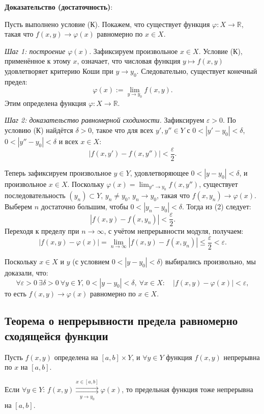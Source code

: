 \documentclass{article}
\begin{document}
\textbf{Доказательство (достаточность)}:

Пусть выполнено условие (К). Покажем, что существует функция $\varphi \colon X \to \mathbb{R}$, такая что $f(x, y) \to \varphi(x)$ равномерно по $x \in X$.

\textit{Шаг 1: построение $\varphi(x)$.}  
Зафиксируем произвольное $x \in X$. Условие (К), применённое к этому $x$, означает, что числовая функция $y \mapsto f(x, y)$ удовлетворяет критерию Коши при $y \to y_0$. Следовательно, существует конечный предел:
\[
\varphi(x) := \lim_{y \to y_0} f(x, y).
\]
Этим определена функция $\varphi \colon X \to \mathbb{R}$.

\textit{Шаг 2: доказательство равномерной сходимости.}  
Зафиксируем $\varepsilon > 0$. По условию (К) найдётся $\delta > 0$, такое что для всех $y', y'' \in Y$ с $0 < |y' - y_0| < \delta$, $0 < |y'' - y_0| < \delta$ и всех $x \in X$:
\[
|f(x, y') - f(x, y'')| < \frac{\varepsilon}{2}.
\tag{2}
\]

Теперь зафиксируем произвольное $y \in Y$, удовлетворяющее $0 < |y - y_0| < \delta$, и произвольное $x \in X$. Поскольку $\varphi(x) = \lim_{y'' \to y_0} f(x, y'')$, существует последовательность $(y_n) \subset Y$, $y_n \ne y_0$, $y_n \to y_0$, такая что $f(x, y_n) \to \varphi(x)$. Выберем $n$ достаточно большим, чтобы $0 < |y_n - y_0| < \delta$. Тогда из (2) следует:
\[
|f(x, y) - f(x, y_n)| < \frac{\varepsilon}{2}.
\]
Переходя к пределу при $n \to \infty$, с учётом непрерывности модуля, получаем:
\[
|f(x, y) - \varphi(x)| = \lim_{n \to \infty} |f(x, y) - f(x, y_n)| \le \frac{\varepsilon}{2} < \varepsilon.
\]

Поскольку $x \in X$ и $y$ (с условием $0 < |y - y_0| < \delta$) выбирались произвольно, мы доказали, что:
\[
\forall \varepsilon > 0\ \exists \delta > 0\ \forall y \in Y,\ 0 < |y - y_0| < \delta,\ \forall x \in X:\quad |f(x, y) - \varphi(x)| < \varepsilon,
\]
то есть $f(x, y) \to \varphi(x)$ равномерно по $x \in X$.

\subsection*{Теорема о непрерывности предела равномерно сходящейся функции}

Пусть $f(x, y)$ определена на $[a, b] \times Y$, и $\forall y \in Y$ функция $f(x, y)$ непрерывна по $x$ на $[a, b]$.

Если $\forall y \in Y$: $f(x, y) \mathop{\rightrightarrows}\limits^{x \in [a,b]}_{\,y \to y_0\,} \varphi(x)$,
то предельная функция тоже непрерывна на $[a, b]$.
\end{document}
